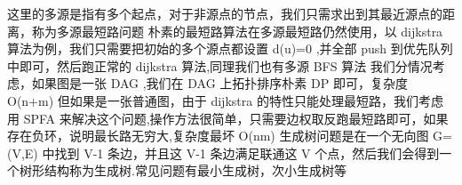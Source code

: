 {}\markdownRendererInterblockSeparator
{}
\markdownRendererSectionEnd \markdownRendererSectionBegin
{}\markdownRendererInterblockSeparator
{}\markdownRendererInterblockSeparator
{}
\markdownRendererSectionEnd 
\markdownRendererSectionEnd \markdownRendererSectionBegin
{}\markdownRendererInterblockSeparator
{}这里的多源是指有多个起点，对于非源点的节点，我们只需求出到其最近源点的距离，称为多源最短路问题\markdownRendererParagraphSeparator
{}朴素的最短路算法在多源最短路仍然使用，以\markdownRendererDollarSign{} dijkstra \markdownRendererDollarSign{}算法为例，我们只需要把初始的多个源点都设置\markdownRendererDollarSign{} d(u)=0 \markdownRendererDollarSign{},并全部\markdownRendererDollarSign{} push \markdownRendererDollarSign{}到优先队列中即可，然后跑正常的\markdownRendererDollarSign{} dijkstra \markdownRendererDollarSign{}算法,同理我们也有多源\markdownRendererDollarSign{} BFS \markdownRendererDollarSign{}算法\markdownRendererInterblockSeparator
{}
\markdownRendererSectionEnd \markdownRendererSectionBegin
{}\markdownRendererInterblockSeparator
{}我们分情况考虑，如果图是一张\markdownRendererDollarSign{} DAG \markdownRendererDollarSign{},我们在\markdownRendererDollarSign{} DAG \markdownRendererDollarSign{}上拓扑排序朴素\markdownRendererDollarSign{} DP \markdownRendererDollarSign{}即可，复杂度\markdownRendererDollarSign{} O(n+m) \markdownRendererDollarSign{}\markdownRendererParagraphSeparator
{}但如果是一张普通图，由于\markdownRendererDollarSign{} dijkstra \markdownRendererDollarSign{}的特性只能处理最短路，我们考虑用\markdownRendererDollarSign{} SPFA\markdownRendererSoftLineBreak
{}\markdownRendererDollarSign{}来解决这个问题,操作方法很简单，只需要边权取反跑最短路即可，如果存在负环，说明最长路无穷大,复杂度最坏\markdownRendererDollarSign{} O(nm) \markdownRendererDollarSign{}\markdownRendererInterblockSeparator
{}
\markdownRendererSectionEnd 
\markdownRendererSectionEnd \markdownRendererSectionBegin
{}\markdownRendererInterblockSeparator
{}生成树问题是在一个无向图\markdownRendererDollarSign{} G=(V,E) \markdownRendererDollarSign{}中找到\markdownRendererDollarSign{} V-1 \markdownRendererDollarSign{}条边，并且这\markdownRendererDollarSign{} V-1 \markdownRendererDollarSign{}条边满足联通这\markdownRendererDollarSign{} V \markdownRendererDollarSign{}个点，然后我们会得到一个树形结构称为生成树.常见问题有最小生成树，次小生成树等\markdownRendererInterblockSeparator
